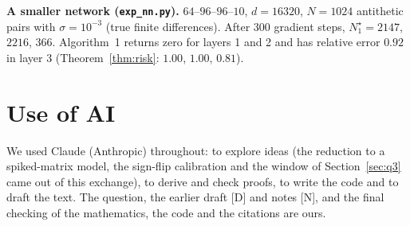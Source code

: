 \textbf{A smaller network (\texttt{exp\_nn.py}).} $64$--$96$--$96$--$10$, $d=16320$, $N=1024$ antithetic pairs with $\sigma=10^{-3}$ (true finite differences). After 300 gradient steps, $N_1^\star=2147$, $2216$, $366$. Algorithm~1 returns zero for layers 1 and 2 and has relative error $0.92$ in layer 3 (Theorem~\ref{thm:risk}: $1.00$, $1.00$, $0.81$).

\section{Use of AI}\label{app:ai}
We used Claude (Anthropic) throughout: to explore ideas (the reduction to a spiked-matrix model, the sign-flip calibration and the window of Section~\ref{sec:q3} came out of this exchange), to derive and check proofs, to write the code and to draft the text. The question, the earlier draft [D] and notes [N], and the final checking of the mathematics, the code and the citations are ours.
